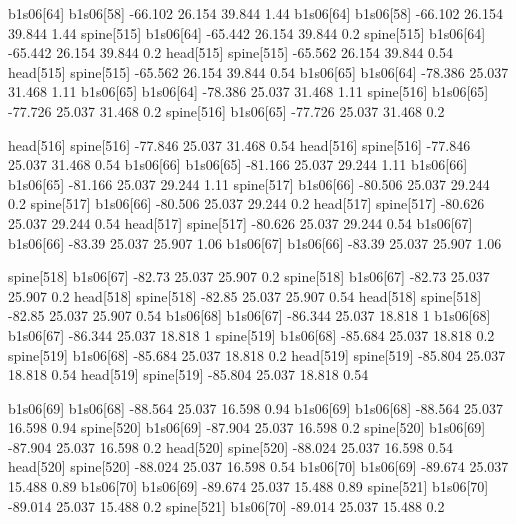 b1s06[64]    b1s06[58]    -66.102    26.154    39.844    1.44
b1s06[64]    b1s06[58]    -66.102    26.154    39.844    1.44
spine[515]    b1s06[64]    -65.442    26.154    39.844    0.2
spine[515]    b1s06[64]    -65.442    26.154    39.844    0.2
head[515]    spine[515]    -65.562    26.154    39.844    0.54
head[515]    spine[515]    -65.562    26.154    39.844    0.54
b1s06[65]    b1s06[64]    -78.386    25.037    31.468    1.11
b1s06[65]    b1s06[64]    -78.386    25.037    31.468    1.11
spine[516]    b1s06[65]    -77.726    25.037    31.468    0.2
spine[516]    b1s06[65]    -77.726    25.037    31.468    0.2


head[516]    spine[516]    -77.846    25.037    31.468    0.54
head[516]    spine[516]    -77.846    25.037    31.468    0.54
b1s06[66]    b1s06[65]    -81.166    25.037    29.244    1.11
b1s06[66]    b1s06[65]    -81.166    25.037    29.244    1.11
spine[517]    b1s06[66]    -80.506    25.037    29.244    0.2
spine[517]    b1s06[66]    -80.506    25.037    29.244    0.2
head[517]    spine[517]    -80.626    25.037    29.244    0.54
head[517]    spine[517]    -80.626    25.037    29.244    0.54
b1s06[67]    b1s06[66]    -83.39    25.037    25.907    1.06
b1s06[67]    b1s06[66]    -83.39    25.037    25.907    1.06


spine[518]    b1s06[67]    -82.73    25.037    25.907    0.2
spine[518]    b1s06[67]    -82.73    25.037    25.907    0.2
head[518]    spine[518]    -82.85    25.037    25.907    0.54
head[518]    spine[518]    -82.85    25.037    25.907    0.54
b1s06[68]    b1s06[67]    -86.344    25.037    18.818    1
b1s06[68]    b1s06[67]    -86.344    25.037    18.818    1
spine[519]    b1s06[68]    -85.684    25.037    18.818    0.2
spine[519]    b1s06[68]    -85.684    25.037    18.818    0.2
head[519]    spine[519]    -85.804    25.037    18.818    0.54
head[519]    spine[519]    -85.804    25.037    18.818    0.54


b1s06[69]    b1s06[68]    -88.564    25.037    16.598    0.94
b1s06[69]    b1s06[68]    -88.564    25.037    16.598    0.94
spine[520]    b1s06[69]    -87.904    25.037    16.598    0.2
spine[520]    b1s06[69]    -87.904    25.037    16.598    0.2
head[520]    spine[520]    -88.024    25.037    16.598    0.54
head[520]    spine[520]    -88.024    25.037    16.598    0.54
b1s06[70]    b1s06[69]    -89.674    25.037    15.488    0.89
b1s06[70]    b1s06[69]    -89.674    25.037    15.488    0.89
spine[521]    b1s06[70]    -89.014    25.037    15.488    0.2
spine[521]    b1s06[70]    -89.014    25.037    15.488    0.2


